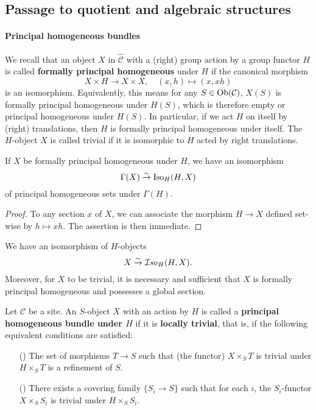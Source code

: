 \subsection{Passage to quotient and algebraic structures}
\paragraph{Principal homogeneous bundles} 
We recall that an object $X$ in $\widehat{\mathcal{C}}$ with a (right) group action by a group functor $H$ is called \textbf{formally principal homogeneous} under $H$ if the canonical morphism
\[X\times H\to X\times X,\quad (x,h)\mapsto (x,xh)\]
is an isomorphism. Equivalently, this means for any $S\in\mathrm{Ob}(\mathcal{C})$, $X(S)$ is formally principal homogeneous under $H(S)$, which is therefore empty or principal homogeneous under $H(S)$. In particular, if we act $H$ on itself by (right) translations, then $H$ is formally principal homogeneous under itself. The $H$-object $X$ is called trivial if it is isomorphic to $H$ acted by right translations.
\begin{proposition}\label{category formally principal homogeneous global section char}
If $X$ be formally principal homogeneous under $H$, we have an isomorphism
\[\Gamma(X)\stackrel{\sim}{\to}\mathrm{Iso}_H(H,X)\]
of principal homogeneous sets under $\Gamma(H)$.
\end{proposition}
\begin{proof}
To any section $x$ of $X$, we can associate the morphism $H\to X$ defined set-wise by $h\mapsto xh$. The assertion is then immediate.
\end{proof}

\begin{corollary}
We have an isomorphism of $H$-objects
\[X\stackrel{\sim}{\to} \operatorname{\mathcal{I}\hspace*{-0.5pt}\textit{so}\hspace{0.5pt}}_H(H,X).\]
Moreover, for $X$ to be trivial, it is necessary and sufficient that $X$ is formally principal homogeneous and possesses a global section.
\end{corollary}

\begin{definition}
Let $\mathcal{C}$ be a site. An $S$-object $X$ with an action by $H$ is called a \textbf{principal homogeneous bundle under $H$} if it is \textbf{locally trivial}, that is, if the following equivalent conditions are satisfied:
\begin{enumerate}
    \item[(\rmnum{1})] The set of morphisms $T\to S$ such that (the functor) $X\times_ST$ is trivial under $H\times_ST$ is a refinement of $S$.
    \item[(\rmnum{2})] There exists a covering family $\{S_i\to S\}$ such that for each $i$, the $S_i$-functor $X\times_SS_i$ is trivial under $H\times_SS_i$.
\end{enumerate}
\end{definition}

